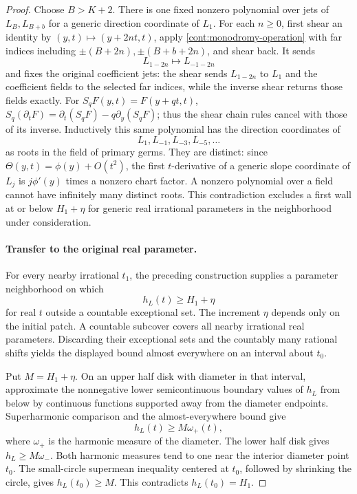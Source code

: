\begin{proof}
Choose \(B>K+2\).  There is one fixed nonzero polynomial
over jets of \(L_B,L_{B+b}\) for a generic direction
coordinate of \(L_1\).  For each \(n\ge0\), first shear an
identity by \((y,t)\mapsto(y+2nt,t)\), apply
\eqref{cont:monodromy-operation} with far indices including
\(\pm(B+2n),\pm(B+b+2n)\), and shear back.  It sends
\[
L_{1-2n}\longmapsto L_{-1-2n}
\]
and fixes the original coefficient jets: the shear sends
\(L_{1-2n}\) to \(L_1\) and the coefficient fields to the selected
far indices, while the inverse shear returns those fields exactly.
For \(S_qF(y,t)=F(y+qt,t)\),
\(S_q(\partial_tF)=\partial_t(S_qF)-q\partial_y(S_qF)\);
thus the shear chain rules cancel with those of its inverse.
Inductively this
same polynomial has the direction coordinates of
\[
 L_1,L_{-1},L_{-3},L_{-5},\ldots
\]
as roots in the field of primary germs.
They are distinct: since
\(\Theta(y,t)=\phi(y)+O(t^2)\), the first \(t\)-derivative
of a generic slope coordinate of \(L_j\) is
\(j\phi'(y)\) times a nonzero chart factor.  A nonzero
polynomial over a field cannot have infinitely many
distinct roots.  This contradiction excludes a first
wall at or below \(H_1+\eta\) for generic real irrational
parameters in the neighborhood under consideration.

\paragraph{Transfer to the original real parameter.}
For every nearby irrational \(t_1\), the preceding
construction supplies a parameter neighborhood on which
\[
 h_L(t)\ge H_1+\eta
\]
for real \(t\) outside a countable exceptional set.
The increment \(\eta\) depends only on the initial patch.
A countable subcover covers all nearby irrational real
parameters.  Discarding their exceptional sets and the
countably many rational shifts yields the displayed
bound almost everywhere on an interval about \(t_0\).

Put \(M=H_1+\eta\).  On an upper half disk with diameter
in that interval, approximate the nonnegative lower
semicontinuous boundary values of \(h_L\) from below by
continuous functions supported away from the diameter
endpoints.  Superharmonic comparison and the
almost-everywhere bound give
\[
 h_L(t)\ge M\omega_+(t),
\]
where \(\omega_+\) is the harmonic measure of the diameter.
The lower half disk gives \(h_L\ge M\omega_-\).
Both harmonic measures tend to one near the interior
diameter point \(t_0\).  The small-circle supermean
inequality centered at \(t_0\), followed by shrinking
the circle, gives \(h_L(t_0)\ge M\).  This contradicts
\(h_L(t_0)=H_1\).


\end{proof}
